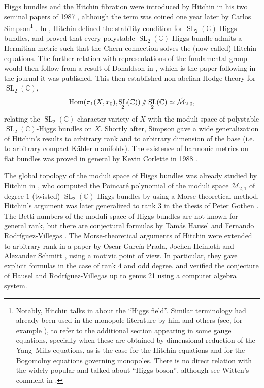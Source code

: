 \documentclass[12pt,a4paper]{amsbook}
\theoremstyle{remark} \newtheorem{rmk}[thm]{Remark}
\theoremstyle{definition} \newtheorem{defn}[thm]{Definition}
\theoremstyle{definition} \newtheorem{ex}[thm]{Example}
\theoremstyle{definition} \newtheorem{ej}{Exercise}
\newcommand{\git}{\mathbin{/\mkern-6mu/}}
\newcommand{\C}{\mathbb C}
\newcommand{\cM}{\mathcal M}
\DeclareMathOperator{\Hom}{Hom}
\DeclareMathOperator{\SL}{SL}
\begin{document}
Higgs bundles and the Hitchin fibration were introduced by Hitchin in his two seminal papers of 1987 \cite{Hitchin_SelfDuality,Hitchin_Systems}, although the term was coined one year later by Carlos Simpson\footnote{Notably, Hitchin talks in \cite{Hitchin_SelfDuality} about the ``Higgs field''. Similar terminology had already been used in the monopole literature by him and others (see, for example \cite{Hitchin_MonopolesGeodesics}), to refer to the additional section appearing in some gauge equations, specially when these are obtained by dimensional reduction of the Yang--Mills equations, as is the case for the Hitchin equations and for the Bogomolny equations governing monopoles. There is no direct relation with the widely popular and talked-about ``Higgs boson'', although see Witten's comment in \cite[Remark 2.1]{Witten_Hitchin}.} \cite{Simpson_Variations}. In \cite{Hitchin_SelfDuality}, Hitchin defined the stability condition for $\SL_2(\C)$-Higgs bundles, and proved that every polystable $\SL_2(\C)$-Higgs bundle admits a Hermitian metric such that the Chern connection solves the (now called) Hitchin equations. The further relation with representations of the fundamental group would then follow from a result of Donaldson in \cite{Donaldson_Harmonic}, which is the paper following \cite{Hitchin_SelfDuality} in the journal it was published. This then established non-abelian Hodge theory for $\SL_2(\C)$,
\begin{equation*}
\Hom(\pi_1(X,x_0),\SL_2(\C))\git \SL_2(\C) \simeq \check{\cM}_{2,0} ,
\end{equation*}
relating the $\SL_2(\C)$-character variety of $X$ with the moduli space of polystable $\SL_2(\C)$-Higgs bundles on $X$. Shortly after, Simpson \cite{Simpson_Variations} gave a wide generalization of Hitchin's results to arbitrary rank and to arbitrary dimension of the base (i.e. to arbitrary compact Kähler manifolds). The existence of harmonic metrics on flat bundles was proved in general by Kevin Corlette in 1988 \cite{Corlette}.

The global topology of the moduli space of Higgs bundles was already studied by Hitchin in \cite{Hitchin_SelfDuality}, who computed the Poincaré polynomial of the moduli space $\check{\cM}_{2,1}$ of degree $1$ (twisted) $\SL_2(\C)$-Higgs bundles by using a Morse-theoretical method. Hitchin's argument was later generalized to rank $3$ in the thesis of Peter Gothen \cite{Gothen}. The Betti numbers of the moduli space of Higgs bundles are not known for general rank, but there are conjectural formulas by Tamás Hausel and Fernando Rodríguez-Villegas \cite{HauselRodriguezVillegas}. The Morse-theoretical arguments of Hitchin were extended to arbitrary rank in a paper by Oscar García-Prada, Jochen Heinloth and Alexander Schmitt \cite{OscarHeinlothSchmitt}, using a motivic point of view. In particular, they gave explicit formulas in the case of rank $4$ and odd degree, and verified the conjecture of Hausel and Rodríguez-Villegas up to genus 21 using a computer algebra system.
\end{document}
